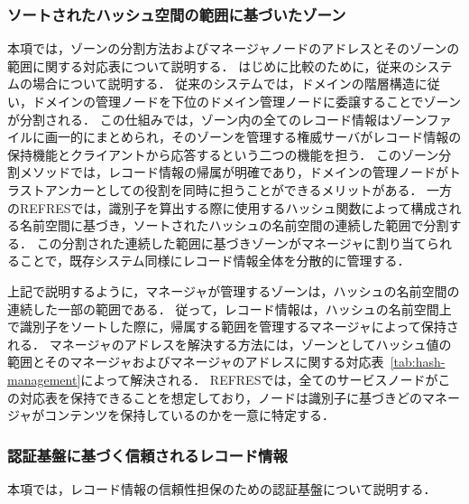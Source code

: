 \subsubsection{ソートされたハッシュ空間の範囲に基づいたゾーン}
本項では，ゾーンの分割方法およびマネージャノードのアドレスとそのゾーンの範囲に関する対応表について説明する．
はじめに比較のために，従来のシステムの場合について説明する．
従来のシステムでは，ドメインの階層構造に従い，ドメインの管理ノードを下位のドメイン管理ノードに委譲することでゾーンが分割される．
この仕組みでは，ゾーン内の全てのレコード情報はゾーンファイルに画一的にまとめられ，そのゾーンを管理する権威サーバがレコード情報の保持機能とクライアントから応答するという二つの機能を担う．
このゾーン分割メソッドでは，レコード情報の帰属が明確であり，ドメインの管理ノードがトラストアンカーとしての役割を同時に担うことができるメリットがある．
一方のREFRESでは，識別子を算出する際に使用するハッシュ関数によって構成される名前空間に基づき，ソートされたハッシュの名前空間の連続した範囲で分割する．
この分割された連続した範囲に基づきゾーンがマネージャに割り当てられることで，既存システム同様にレコード情報全体を分散的に管理する．

上記で説明するように，マネージャが管理するゾーンは，ハッシュの名前空間の連続した一部の範囲である．
従って，レコード情報は，ハッシュの名前空間上で識別子をソートした際に，帰属する範囲を管理するマネージャによって保持される．
マネージャのアドレスを解決する方法には，ゾーンとしてハッシュ値の範囲とそのマネージャおよびマネージャのアドレスに関する対応表~\ref{tab:hash-management}によって解決される．
REFRESでは，全てのサービスノードがこの対応表を保持できることを想定しており，ノードは識別子に基づきどのマネージャがコンテンツを保持しているのかを一意に特定する．


\subsubsection{認証基盤に基づく信頼されるレコード情報}
\label{sec:certificate}
本項では，レコード情報の信頼性担保のための認証基盤について説明する．

